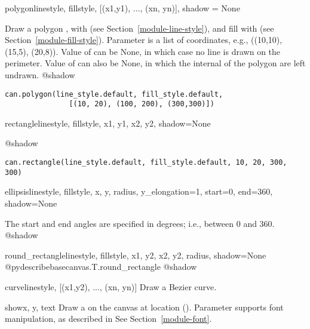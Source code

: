 \documentclass{howto}
\newcommand{\xref}[1]{See Section~\ref{#1}}
\newcommand{\pxref}[1]{see Section~\ref{#1}}
\begin{document}
\begin{methoddesc}{polygon}{linestyle, fillstyle, [(x1,y1), ..., (xn, yn)], shadow = None}

Draw a polygon , with 
(\pxref{module-line-style}), and fill with
(\pxref{module-fill-style}). Parameter 
is a list of
coordinates, e.g., ((10,10), (15,5), (20,8)).
Value of  can be None, in which case
no line is drawn on the perimeter.  Value of  can also be
None, in which the internal of the polygon are left undrawn.
@shadow

\begin{verbatim}
can.polygon(line_style.default, fill_style.default,
               [(10, 20), (100, 200), (300,300)])
\end{verbatim}
\end{methoddesc}

\begin{methoddesc}{rectangle}{linestyle, fillstyle, x1, y1, x2, y2, shadow=None}

@shadow

\begin{verbatim}
can.rectangle(line_style.default, fill_style.default, 10, 20, 300, 300)
\end{verbatim}
\end{methoddesc}
\begin{methoddesc}{ellipsis}{linestyle, fillstyle, x, y, radius, y_elongation=1, start=0, end=360, shadow=None}

The start and end angles are specified in degrees; i.e., between 0 and
360.
@shadow

\end{methoddesc}
\begin{methoddesc}{round_rectangle}{linestyle, fillstyle, x1, y2, x2, y2, radius, shadow=None}
@pydescribe{basecanvas.T.round_rectangle}
@shadow
\end{methoddesc}

\begin{methoddesc}{curve}{linestyle, [(x1,y2), ..., (xn, yn)]}
Draw a Bezier curve.
\end{methoddesc}
\begin{methoddesc}{show}{x, y, text}
Draw a  on the canvas at location ().
Parameter  supports font manipulation, as
described in \xref{module-font}.
\end{methoddesc}
\end{document}
